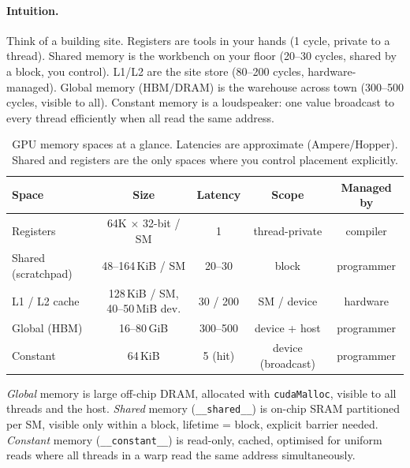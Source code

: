 \paragraph{Intuition.} Think of a building site. Registers are tools in your hands (1 cycle, private to a thread). Shared memory is the workbench on your floor (20--30 cycles, shared by a block, you control). L1/L2 are the site store (80--200 cycles, hardware-managed). Global memory (HBM/DRAM) is the warehouse across town (300--500 cycles, visible to all). Constant memory is a loudspeaker: one value broadcast to every thread efficiently when all read the same address.

\begin{table}[h]\centering\small
\begin{tabular}{lcccc}
\toprule
Space & Size & Latency & Scope & Managed by\\
\midrule
Registers & 64K $\times$ 32-bit / SM & 1 & thread-private & compiler\\
Shared (scratchpad) & 48--164\,KiB / SM & 20--30 & block & programmer\\
L1 / L2 cache & 128\,KiB / SM, 40--50\,MiB dev. & 30 / 200 & SM / device & hardware\\
Global (HBM) & 16--80\,GiB & 300--500 & device + host & programmer\\
Constant & 64\,KiB & 5 (hit) & device (broadcast) & programmer\\
\bottomrule
\end{tabular}
\caption{GPU memory spaces at a glance. Latencies are approximate (Ampere/Hopper). Shared and registers are the only spaces where you control placement explicitly.}
\end{table}

\begin{definition}
\emph{Global} memory is large off-chip DRAM, allocated with \texttt{cudaMalloc}, visible to all threads and the host. \emph{Shared} memory (\texttt{\_\_shared\_\_}) is on-chip SRAM partitioned per SM, visible only within a block, lifetime = block, explicit barrier needed. \emph{Constant} memory (\texttt{\_\_constant\_\_}) is read-only, cached, optimised for uniform reads where all threads in a warp read the same address simultaneously.
\end{definition}

